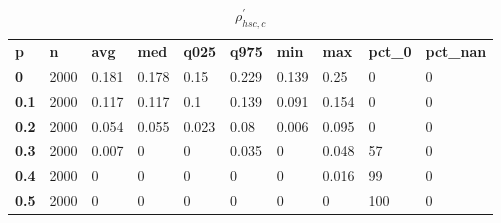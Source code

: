 \begin{table}[h]
 \centering 
\footnotesize
\caption{$\rho_{hsc,c}^\prime $}
\label{tab:alphahscc}
\begin{tabular}[h]{| l l l l l l l l l l|
    } \hline
\textbf{ p} & \textbf{ n} & \textbf{ avg} & \textbf{ med} & \textbf{ q025} & \textbf{ q975} & \textbf{ min} & \textbf{ max} & \textbf{ pct\_0} & \textbf{ pct\_nan}
           \\
  \textbf{  0} & 2000 & 0.181 & 0.178 &  0.15 & 0.229 & 0.139 &  0.25 &   0 & 0
           \\
  \textbf{0.1} & 2000 & 0.117 & 0.117 &   0.1 & 0.139 & 0.091 & 0.154 &   0 & 0
           \\
  \textbf{0.2} & 2000 & 0.054 & 0.055 & 0.023 &  0.08 & 0.006 & 0.095 &   0 & 0
           \\
  \textbf{0.3} & 2000 & 0.007 &     0 &     0 & 0.035 &     0 & 0.048 &  57 & 0
           \\
  \textbf{0.4} & 2000 &     0 &     0 &     0 &     0 &     0 & 0.016 &  99 & 0
           \\
  \textbf{0.5} & 2000 &     0 &     0 &     0 &     0 &     0 &     0 & 100 & 0
           \\
 \hline \end{tabular}
 \end{table}
